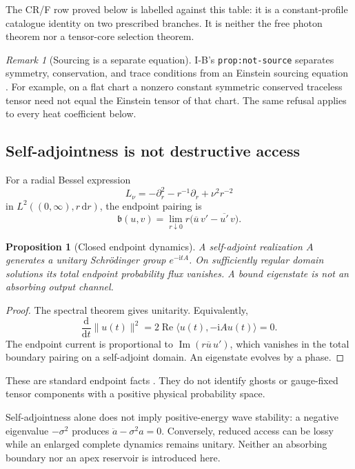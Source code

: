 \documentclass[11pt,a4paper]{article}
\newcommand{\dd}{\mathrm d}
\newcommand{\ii}{\mathrm i}
\newcommand{\norm}[1]{\lVert#1\rVert}
\newcommand{\pair}[2]{\langle#1,#2\rangle}
\newcommand{\loc}[1]{\nolinkurl{#1}}
\theoremstyle{plain}
\newtheorem{proposition}[theorem]{Proposition}
\theoremstyle{definition}
\theoremstyle{remark}
\newtheorem{remark}[theorem]{Remark}
\numberwithin{equation}{section}
\begin{document}
The CR/F row proved below is labelled against this table:
it is a constant-profile catalogue identity on two prescribed
branches. It is neither the free photon theorem nor a tensor-core
selection theorem.

\begin{remark}[Sourcing is a separate equation]
I-B's \loc{prop:not-source} separates symmetry, conservation, and
trace conditions from an Einstein sourcing equation
\cite{CheungIB}. For example, on a flat chart a nonzero constant
symmetric conserved traceless tensor need not equal the
Einstein tensor of that chart.
The same refusal applies to every heat coefficient below.
\end{remark}

\subsection{Self-adjointness is not destructive access}

For a radial Bessel expression
\[
 L_\nu=-\partial_r^2-r^{-1}\partial_r+\nu^2r^{-2}
\]
in \(L^2((0,\infty),r\,\dd r)\), the endpoint pairing is
\begin{equation}
 \mathfrak b(u,v)=
 \lim_{r\downarrow0}r
 \bigl(\overline u\,v'-\overline{u'}\,v\bigr).
 \label{eq:boundary}
\end{equation}

\begin{proposition}[Closed endpoint dynamics]
\label{prop:unitary}
A self-adjoint realization \(A\) generates a unitary
Schr\"odinger group \(e^{-\ii tA}\). On sufficiently regular
domain solutions its total endpoint probability flux vanishes.
A bound eigenstate is not an absorbing output channel.
\end{proposition}

\begin{proof}
The spectral theorem gives unitarity. Equivalently,
\[
 \frac{\dd}{\dd t}\norm{u(t)}^2
 =2\operatorname{Re}\pair{u(t)}{-\ii Au(t)}=0.
\]
The endpoint current is proportional to
\(\operatorname{Im}(r\overline u\,u')\), which vanishes in the
total boundary pairing on a self-adjoint domain.
An eigenstate evolves by a phase.
\end{proof}

These are standard endpoint facts
\cite{DerezinskiRichard,KayStuder}.
They do not identify ghosts or gauge-fixed tensor components
with a positive physical probability space.

Self-adjointness alone does not imply positive-energy wave
stability: a negative eigenvalue \(-\sigma^2\) produces
\(\ddot a-\sigma^2a=0\). Conversely, reduced access can be lossy
while an enlarged complete dynamics remains unitary.
Neither an absorbing boundary nor an apex reservoir is introduced
here.
\end{document}
